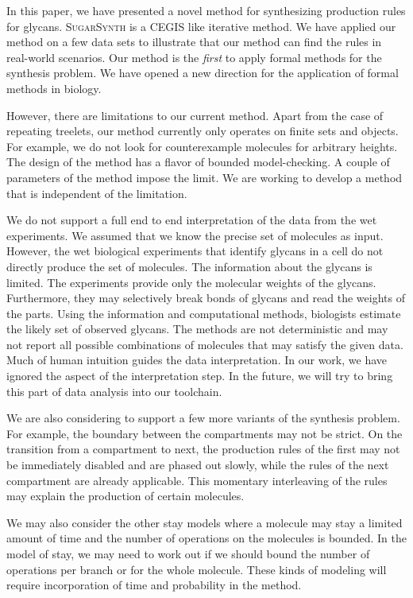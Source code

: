 % 
In this paper, we have presented a novel method for synthesizing production rules for glycans.
\textsc{SugarSynth} is a CEGIS like iterative method.
We have applied our method on a few data sets to illustrate that our method
can find the rules in real-world scenarios.
Our method is the {\em first} to apply formal methods for the synthesis problem.
We have opened a new direction for the application of formal methods in biology.


However, there are limitations to our current method.
Apart from the case of repeating treelets,
our method currently only operates on finite sets and objects.
For example, we do not look for counterexample molecules for arbitrary heights.
The design of the method has a flavor of bounded model-checking.
A couple of parameters of the method impose the limit. 
We are working to develop a method that is independent of the limitation.

We do not support a full end to end interpretation of the data from the wet experiments.
We assumed that we know the precise set of molecules as input.
However, the wet biological experiments that identify glycans in a cell do not directly
produce the set of molecules.
The information about the glycans is limited.
The experiments provide only the molecular weights of the glycans.
Furthermore, they may selectively break bonds of glycans and read the weights of the
parts.
Using the information and computational methods, biologists estimate the likely
set of observed glycans.
The methods are not deterministic and may not report all possible combinations
of molecules that may satisfy the given data.
Much of human intuition guides the data interpretation.
In our work, we have ignored the aspect of
the interpretation step.
In the future, we will try to bring this part of data analysis
into our toolchain. 

We are also considering to support a few more variants of the synthesis problem.
For example, the boundary between the compartments may not be strict.
On the transition from a compartment to next,
the production rules of the first may not be immediately disabled and
are phased out slowly, while the rules of the next compartment are already applicable.
This momentary interleaving of the rules may explain the production of certain molecules.

We may also consider the other stay models where a molecule may stay
a limited amount of time and the number of operations on the molecules is
bounded.
In the model of stay, we may need to work out if we should bound the number
of operations per branch or for the whole molecule.
These kinds of modeling will require incorporation of time and probability in the method.

